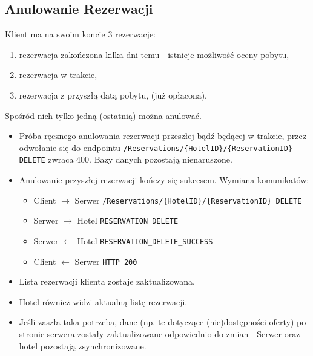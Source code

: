 \documentclass{article}
\begin{document}
\subsection{Anulowanie Rezerwacji}
Klient ma na swoim koncie 3 rezerwacje: 
\renewcommand{\labelenumi}{\alph{enumi}}
\begin{enumerate}
    \item rezerwacja zakończona kilka dni temu - istnieje możliwość oceny pobytu,
    \item rezerwacja w trakcie,
    \item rezerwacja z przyszłą datą pobytu, (już opłacona).
\end{enumerate}
Spośród nich tylko jedną (ostatnią) można anulować.

\begin{itemize}
    \item Próba ręcznego anulowania rezerwacji przeszłej bądź będącej w trakcie, przez odwołanie się do endpointu \texttt{/Reservations/\{HotelID\}/\{ReservationID\} DELETE} zwraca 400. Bazy danych pozostają nienaruszone.
    \item Anulowanie przyszłej rezerwacji kończy się sukcesem. Wymiana komunikatów:
    \begin{itemize}
        \item Client $\rightarrow$ Serwer \texttt{/Reservations/\{HotelID\}/\{ReservationID\} DELETE}
        \item Serwer $\rightarrow$ Hotel \texttt{RESERVATION\_DELETE}
        \item Serwer $\leftarrow$ Hotel \texttt{RESERVATION\_DELETE\_SUCCESS}
        \item Client $\leftarrow$ Serwer \texttt{HTTP 200}
    \end{itemize}
    \item Lista rezerwacji klienta zostaje zaktualizowana.
    \item Hotel również widzi aktualną listę rezerwacji.
    \item Jeśli zaszła taka potrzeba, dane (np. te dotyczące (nie)dostępności oferty) po stronie serwera zostały zaktualizowane odpowiednio do zmian - Serwer oraz hotel pozostają zsynchronizowane.
    
\end{itemize}
\end{document}
